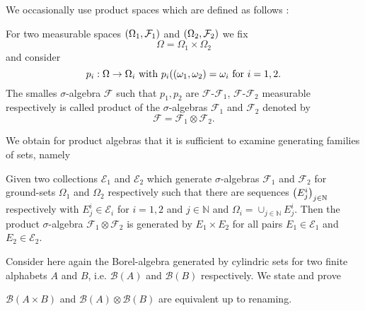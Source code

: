 We occasionally use product spaces which are defined as follows 
\cite[Chapter 22]{Bauer}:
\begin{definition}
  For two measurable spaces $\left(\Omega_{1}, \mathcal{F}_{1}\right)$ and 
  $\left(\Omega_{2}, \mathcal{F}_{2}\right)$ we fix
  \begin{equation*}
    \Omega = \Omega_{1}\times\Omega_{2}
  \end{equation*}
  and consider
  \begin{equation*}
    p_{i}:\Omega\rightarrow\Omega_{i}\text{ with }
      p_{i}(\left(\omega_{1}, \omega_{2}\right) = \omega_{i}\text{ for }i = 1,2.
  \end{equation*}
  The smalles $\sigma$-algebra $\mathcal{F}$ such that $p_{1}, p_{2}$ are 
  $\mathcal{F}$-$\mathcal{F_{1}}$, $\mathcal{F}$-$\mathcal{F_{2}}$ measurable 
  respectively is called product of the $\sigma$-algebras $\mathcal{F}_{1}$ and
  $\mathcal{F}_{2}$ denoted by
  \begin{equation*}
    \mathcal{F} = \mathcal{F}_{1}\otimes\mathcal{F}_{2}.
  \end{equation*}
\end{definition}
We obtain for product algebras that it is sufficient to examine generating
families of sets, namely
\begin{theorem}
  \cite[Theorem 22.1]{Bauer}
  Given two collections $\mathcal{E}_{1}$ and $\mathcal{E}_{2}$ which 
  generate $\sigma$-algebras $\mathcal{F}_{1}$ and $\mathcal{F}_{2}$ for 
  ground-sets $\Omega_{1}$ and $\Omega_{2}$ respectively such that there are
  sequences $\left(E^{i}_{j}\right)_{j\in\mathbb{N}}$ respectively with 
  $E^{i}_{j}\in\mathcal{E}_{i}$ for $i = 1,2$ and $j\in\mathbb{N}$ and 
  $\Omega_{i} = \cup_{j\in\mathbb{N}}E_{j}^{i}$. Then the product 
  $\sigma$-algebra $\mathcal{F}_{1}\otimes\mathcal{F}_{2}$ is generated by 
  $E_{1}\times E_{2}$ for all pairs $E_{1}\in\mathcal{E}_{1}$ and 
  $E_{2}\in\mathcal{E}_{2}$. 
  \label{thm:productgen}
\end{theorem}
Consider here again the Borel-algebra generated by cylindric sets for two 
finite alphabets $A$ and $B$, i.e. $\mathcal{B}(A)$ and $\mathcal{B}(B)$ 
respectively. We state and prove
\begin{lemma}
  $\mathcal{B}(A\times B)$ and $\mathcal{B}(A)\otimes\mathcal{B}(B)$ are 
  equivalent up to renaming.
\end{lemma}
